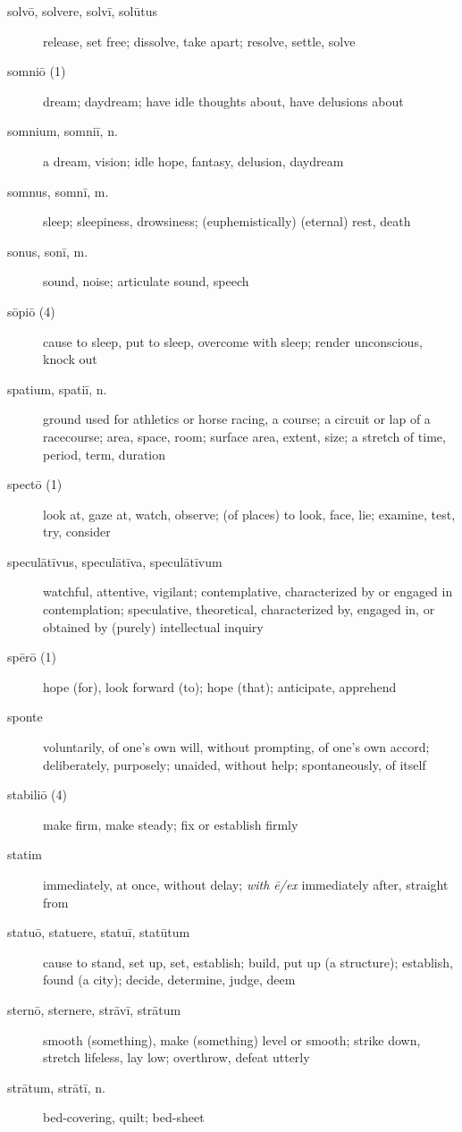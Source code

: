 \begin{description}
    \item[solvō, solvere, solvī, solūtus] \marginnote{*}release, set free; dissolve, take apart; resolve, settle, solve
    \item[somniō (1)] dream; daydream; have idle thoughts about, have delusions about
    \item[somnium, somniī, n.] a dream, vision; idle hope, fantasy, delusion, daydream
    \item[somnus, somnī, m.] \marginnote{*}sleep; sleepiness, drowsiness; (euphemistically) (eternal) rest, death
    \item[sonus, sonī, m.] sound, noise; articulate sound, speech
    \item[sōpiō (4)] cause to sleep, put to sleep, overcome with sleep; render unconscious, knock out
    \item[spatium, spatiī, n.] \marginnote{*}ground used for athletics or horse racing, a course; a circuit or lap of a racecourse; area, space, room; surface area, extent, size; a stretch of time, period, term, duration
    \item[spectō (1)] look at, gaze at, watch, observe; (of places) to look, face, lie; examine, test, try, consider
    \item[speculātīvus, speculātīva, speculātīvum] watchful, attentive, vigilant; contemplative, characterized by or engaged in contemplation; speculative, theoretical, characterized by, engaged in, or obtained by (purely) intellectual inquiry
    \item[spērō (1)] \marginnote{*}hope (for), look forward (to); hope (that); anticipate, apprehend
    \item[sponte] voluntarily, of one's own will, without prompting, of one's own accord; deliberately, purposely; unaided, without help; spontaneously, of itself
    \item[stabiliō (4)] make firm, make steady; fix or establish firmly
    \item[statim] \marginnote{*}immediately, at once, without delay; \textit{with ē/ex} immediately after, straight from
    \item[statuō, statuere, statuī, statūtum] \marginnote{*}cause to stand, set up, set, establish; build, put up (a structure); establish, found (a city); decide, determine, judge, deem
    \item[sternō, sternere, strāvī, strātum] smooth (something), make (something) level or smooth; strike down, stretch lifeless, lay low; overthrow, defeat utterly
    \item[strātum, strātī, n.] bed-covering, quilt; bed-sheet

\end{description}
